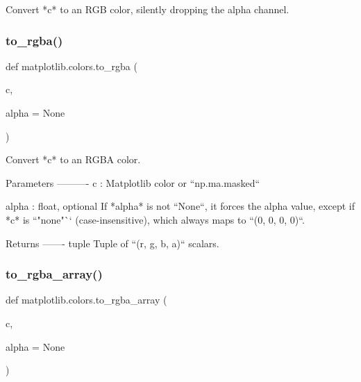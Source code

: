 \begin{DoxyVerb}Convert *c* to an RGB color, silently dropping the alpha channel.\end{DoxyVerb}
 \mbox{\label{namespacematplotlib_1_1colors_ab7a6e21b0eb393bbeedfd1460836a31f}} 
\subsubsection{\texorpdfstring{to\+\_\+rgba()}{to\_rgba()}}
{\footnotesize\ttfamily def matplotlib.\+colors.\+to\+\_\+rgba (\begin{DoxyParamCaption}\item[{}]{c,  }\item[{}]{alpha = {\ttfamily None} }\end{DoxyParamCaption})}

\begin{DoxyVerb}Convert *c* to an RGBA color.

Parameters
----------
c : Matplotlib color or ``np.ma.masked``

alpha : float, optional
    If *alpha* is not ``None``, it forces the alpha value, except if *c* is
    ``"none"`` (case-insensitive), which always maps to ``(0, 0, 0, 0)``.

Returns
-------
tuple
    Tuple of ``(r, g, b, a)`` scalars.
\end{DoxyVerb}
 \mbox{\label{namespacematplotlib_1_1colors_a0bba722bf0433deacb90ea8dc18bbc8d}} 
\subsubsection{\texorpdfstring{to\+\_\+rgba\+\_\+array()}{to\_rgba\_array()}}
{\footnotesize\ttfamily def matplotlib.\+colors.\+to\+\_\+rgba\+\_\+array (\begin{DoxyParamCaption}\item[{}]{c,  }\item[{}]{alpha = {\ttfamily None} }\end{DoxyParamCaption})}

